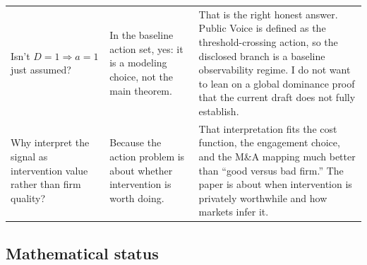 \documentclass[9pt,a4paper]{extarticle}
\begin{document}
{\begin{longtable}{@{}P{0.24\textwidth}P{0.22\textwidth}P{0.48\textwidth}@{}}
Isn't $D=1 \Rightarrow a=1$ just assumed? &
In the baseline action set, yes: it is a modeling choice, not the main theorem. &
That is the right honest answer. Public Voice is defined as the threshold-crossing action, so the disclosed branch is a baseline observability regime. I do not want to lean on a global dominance proof that the current draft does not fully establish. \\

Why interpret the signal as intervention value rather than firm quality? &
Because the action problem is about whether intervention is worth doing. &
That interpretation fits the cost function, the engagement choice, and the M\&A mapping much better than “good versus bad firm.” The paper is about when intervention is privately worthwhile and how markets infer it. \\
\bottomrule
\end{longtable}
}

\subsection{Mathematical status}
\end{document}
